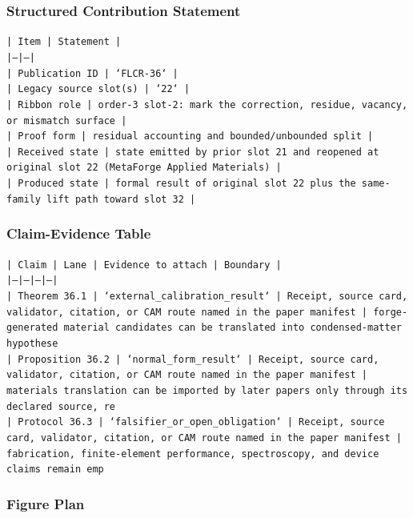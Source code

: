 \documentclass[11pt]{article}
\begin{document}
\subsubsection*{Structured Contribution Statement}

\noindent\texttt{| Item | Statement |}\\
\noindent\texttt{|---|---|}\\
\noindent\texttt{| Publication ID | `FLCR-36` |}\\
\noindent\texttt{| Legacy source slot(s) | `22` |}\\
\noindent\texttt{| Ribbon role | order-3 slot-2: mark the correction, residue, vacancy, or mismatch surface |}\\
\noindent\texttt{| Proof form | residual accounting and bounded/unbounded split |}\\
\noindent\texttt{| Received state | state emitted by prior slot 21 and reopened at original slot 22 (MetaForge Applied Materials) |}\\
\noindent\texttt{| Produced state | formal result of original slot 22 plus the same-family lift path toward slot 32 |}\\

\subsubsection*{Claim-Evidence Table}

\noindent\texttt{| Claim | Lane | Evidence to attach | Boundary |}\\
\noindent\texttt{|---|---|---|---|}\\
\noindent\texttt{| Theorem 36.1 | `external\_calibration\_result` | Receipt, source card, validator, citation, or CAM route named in the paper manifest | forge-generated material candidates can be translated into condensed-matter hypothese}\\
\noindent\texttt{| Proposition 36.2 | `normal\_form\_result` | Receipt, source card, validator, citation, or CAM route named in the paper manifest | materials translation can be imported by later papers only through its declared source, re}\\
\noindent\texttt{| Protocol 36.3 | `falsifier\_or\_open\_obligation` | Receipt, source card, validator, citation, or CAM route named in the paper manifest | fabrication, finite-element performance, spectroscopy, and device claims remain emp}\\

\subsubsection*{Figure Plan}
\end{document}
